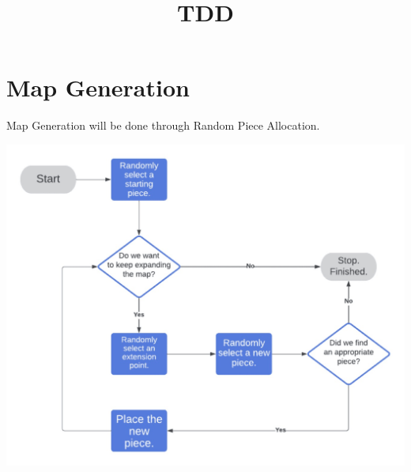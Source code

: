 \documentclass[10pt, a4paper]{article}
\title{TDD}
\author{}
\date{}
\begin{document}
	\maketitle
	\tableofcontents
	\pagebreak
	
	\section {Map Generation} Map Generation will be done through Random Piece Allocation.
	\begin{center}
		\includegraphics[width=0.7\linewidth]{"Assets/Random Piece Allocation"}
	\end{center}
	

	 
\end{document}
